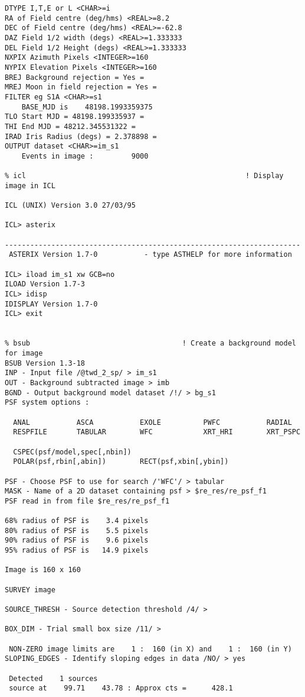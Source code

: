 \begin{small}
\begin{verbatim}
DTYPE I,T,E or L <CHAR>=i
RA of Field centre (deg/hms) <REAL>=8.2
DEC of Field centre (deg/hms) <REAL>=-62.8
DAZ Field 1/2 width (degs) <REAL>=1.333333
DEL Field 1/2 Height (degs) <REAL>=1.333333
NXPIX Azimuth Pixels <INTEGER>=160
NYPIX Elevation Pixels <INTEGER>=160
BREJ Background rejection = Yes =
MREJ Moon in field rejection = Yes =
FILTER eg S1A <CHAR>=s1
    BASE_MJD is    48198.1993359375
TLO Start MJD = 48198.199335937 =
THI End MJD = 48212.345531322 =
IRAD Iris Radius (degs) = 2.378898 =
OUTPUT dataset <CHAR>=im_s1
    Events in image :         9000

% icl                                                    ! Display image in ICL

ICL (UNIX) Version 3.0 27/03/95

ICL> asterix

----------------------------------------------------------------------
 ASTERIX Version 1.7-0           - type ASTHELP for more information

ICL> iload im_s1 xw GCB=no
ILOAD Version 1.7-3
ICL> idisp
IDISPLAY Version 1.7-0
ICL> exit


% bsub                                    ! Create a background model for image
BSUB Version 1.3-18
INP - Input file /@twd_2_sp/ > im_s1
OUT - Background subtracted image > imb
BGND - Output background model dataset /!/ > bg_s1
PSF system options :

  ANAL           ASCA           EXOLE          PWFC           RADIAL
  RESPFILE       TABULAR        WFC            XRT_HRI        XRT_PSPC

  CSPEC(psf/model,spec[,nbin])
  POLAR(psf,rbin[,abin])        RECT(psf,xbin[,ybin])

PSF - Choose PSF to use for search /'WFC'/ > tabular
MASK - Name of a 2D dataset containing psf > $re_res/re_psf_f1
PSF read in from file $re_res/re_psf_f1

68% radius of PSF is    3.4 pixels
80% radius of PSF is    5.5 pixels
90% radius of PSF is    9.6 pixels
95% radius of PSF is   14.9 pixels

Image is 160 x 160

SURVEY image

SOURCE_THRESH - Source detection threshold /4/ >

BOX_DIM - Trial small box size /11/ >

 NON-ZERO image limits are    1 :  160 (in X) and    1 :  160 (in Y)
SLOPING_EDGES - Identify sloping edges in data /NO/ > yes

 Detected    1 sources
 source at    99.71    43.78 : Approx cts =      428.1


\end{verbatim}
\end{small}
